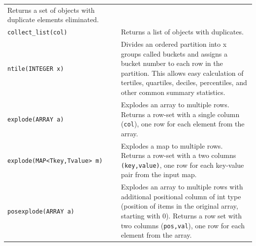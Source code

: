\documentclass[
]{article}
\begin{document}
\begin{longtable}[]{@{}ll@{}}
\begin{minipage}[t]{0.55\columnwidth}
Returns a set of objects with duplicate elements eliminated.\strut
\end{minipage}\tabularnewline
\begin{minipage}[t]{0.39\columnwidth}\raggedright
\texttt{collect\_list(col)}\strut
\end{minipage} & \begin{minipage}[t]{0.55\columnwidth}\raggedright
Returns a list of objects with duplicates.\strut
\end{minipage}\tabularnewline
\begin{minipage}[t]{0.39\columnwidth}\raggedright
\texttt{ntile(INTEGER\ x)}\strut
\end{minipage} & \begin{minipage}[t]{0.55\columnwidth}\raggedright
Divides an ordered partition into x groups called buckets and assigns a
bucket number to each row in the partition. This allows easy calculation
of tertiles, quartiles, deciles, percentiles, and other common summary
statistics.\strut
\end{minipage}\tabularnewline
\begin{minipage}[t]{0.39\columnwidth}\raggedright
\texttt{explode(ARRAY\ a)}\strut
\end{minipage} & \begin{minipage}[t]{0.55\columnwidth}\raggedright
Explodes an array to multiple rows. Returns a row-set with a single
column (\texttt{col}), one row for each element from the array.\strut
\end{minipage}\tabularnewline
\begin{minipage}[t]{0.39\columnwidth}\raggedright
\texttt{explode(MAP\textless{}Tkey,Tvalue\textgreater{}\ m)}\strut
\end{minipage} & \begin{minipage}[t]{0.55\columnwidth}\raggedright
Explodes a map to multiple rows. Returns a row-set with a two columns
\texttt{(key,value)}, one row for each key-value pair from the input
map.\strut
\end{minipage}\tabularnewline
\begin{minipage}[t]{0.39\columnwidth}\raggedright
\texttt{posexplode(ARRAY\ a)}\strut
\end{minipage} & \begin{minipage}[t]{0.55\columnwidth}\raggedright
Explodes an array to multiple rows with additional positional column of
int type (position of items in the original array, starting with 0).
Returns a row￾set with two columns (\texttt{pos,val}), one row for each
element from the array.\strut

\end{minipage}
\end{longtable}
\end{document}
